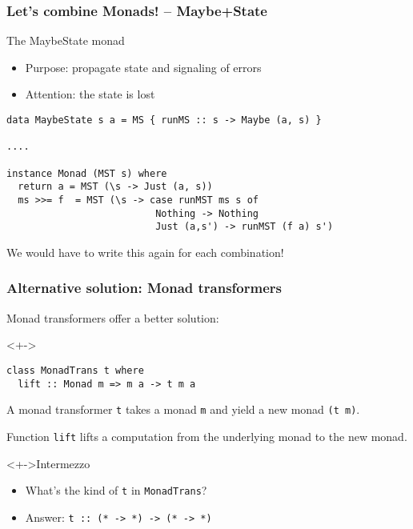 \documentclass[pdftex,aspectratio=169]{beamer}
\begin{document}
\begin{frame}[fragile]
  \frametitle{Let's combine Monads! -- Maybe+State}
  \begin{block}{The MaybeState monad}
    \begin{itemize}
    \item Purpose: propagate state and signaling of errors
    \item Attention: the state is lost
    \end{itemize}
      \begin{lstlisting}
data MaybeState s a = MS { runMS :: s -> Maybe (a, s) }

....

instance Monad (MST s) where
  return a = MST (\s -> Just (a, s))
  ms >>= f  = MST (\s -> case runMST ms s of
                          Nothing -> Nothing
                          Just (a,s') -> runMST (f a) s')
      \end{lstlisting}
    \end{block}
    \pause
    We would have to write this again for each combination!
\end{frame}

\begin{frame}[fragile]
  \frametitle{Alternative solution: Monad transformers}

  Monad transformers offer a better solution:
  \begin{block}<+->{}
\begin{lstlisting}
class MonadTrans t where
  lift :: Monad m => m a -> t m a
\end{lstlisting}

\end{block}

A monad transformer \lstinline{t} takes a monad \lstinline{m} and yield a new monad
\lstinline{(t m)}.

Function \lstinline{lift} lifts a computation from the underlying
monad to the new monad.

\begin{block}<+->{Intermezzo}
  \begin{itemize}[<+->]
  \item What's the kind of \lstinline{t} in \lstinline{MonadTrans}?
  \item Answer: \lstinline{t :: (* -> *) -> (* -> *)}
  \end{itemize}
\end{block}
\end{frame}
\end{document}
